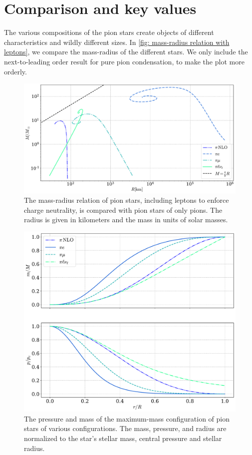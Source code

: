 \section{Comparison and key values}


The various compositions of the pion stars create objects of different characteristics and wildly different sizes.
In \autoref{fig: mass-radius relation with leptons}, we compare the mass-radius of the different stars.
We only include the next-to-leading order result for pure pion condensation, to make the plot more orderly.


\begin{figure}[!htb]
    \centering
    \includegraphics[width=.9\textwidth]{../scripts/figurer/pion_star/mass_radius_all.pdf}
    \caption{
        The mass-radius relation of pion stars, including leptons to enforce charge neutrality, is compared with pion stars of only pions.
        The radius is given in kilometers and the mass in units of solar masses.
        }
        \label{fig: mass-radius relation with leptons}
\end{figure}

\begin{figure}[!htb]
    \centering
    \includegraphics[width=.8\textwidth]{../scripts/figurer/pion_star/max_pressure_mass.pdf}
    \caption{
        The pressure and mass of the maximum-mass configuration of pion stars of various configurations.
        The mass, pressure, and radius are normalized to the star's stellar mass, central pressure and stellar radius.
        }
        \label{fig: max pressure and mass}
\end{figure}


